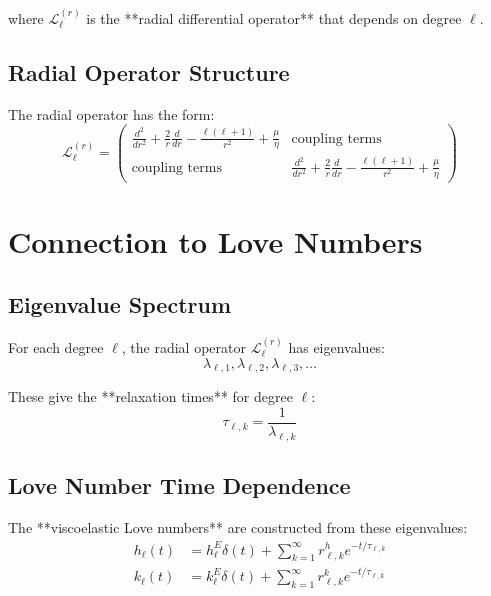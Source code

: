 \documentclass{article}
\begin{document}
where $\mathcal{L}_\ell^{(r)}$ is the **radial differential operator** that depends on degree $\ell$.

\subsection{Radial Operator Structure}

The radial operator has the form:
\begin{equation}
\mathcal{L}_\ell^{(r)} = \begin{pmatrix}
\frac{d^2}{dr^2} + \frac{2}{r}\frac{d}{dr} - \frac{\ell(\ell+1)}{r^2} + \frac{\mu}{\eta} & \text{coupling terms} \\
\text{coupling terms} & \frac{d^2}{dr^2} + \frac{2}{r}\frac{d}{dr} - \frac{\ell(\ell+1)}{r^2} + \frac{\mu}{\eta}
\end{pmatrix}
\end{equation}

\section{Connection to Love Numbers}

\subsection{Eigenvalue Spectrum}

For each degree $\ell$, the radial operator $\mathcal{L}_\ell^{(r)}$ has eigenvalues:
\begin{equation}
\lambda_{\ell,1}, \lambda_{\ell,2}, \lambda_{\ell,3}, \ldots
\end{equation}

These give the **relaxation times** for degree $\ell$:
\begin{equation}
\tau_{\ell,k} = \frac{1}{\lambda_{\ell,k}}
\end{equation}

\subsection{Love Number Time Dependence}

The **viscoelastic Love numbers** are constructed from these eigenvalues:
\begin{align}
h_\ell(t) &= h_\ell^E \delta(t) + \sum_{k=1}^{\infty} r_{\ell,k}^h e^{-t/\tau_{\ell,k}} \\
k_\ell(t) &= k_\ell^E \delta(t) + \sum_{k=1}^{\infty} r_{\ell,k}^k e^{-t/\tau_{\ell,k}}
\end{align}
\end{document}
